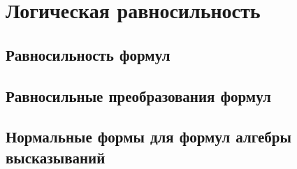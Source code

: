 \section{Логическая равносильность}
\subsection{Равносильность формул}
\subsection{Равносильные преобразования формул}
\subsection{Нормальные формы для формул алгебры высказываний}